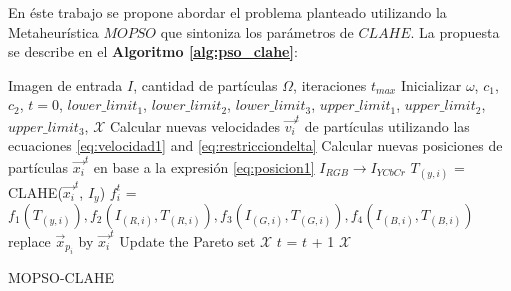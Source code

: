 En éste trabajo se propone abordar el problema planteado utilizando la Metaheurística $MOPSO$ que sintoniza los parámetros de $CLAHE$. La propuesta se describe en el \textbf{Algoritmo \ref{alg:pso_clahe}}:

\begin{algorithm}[H]
\scriptsize
\begin{algorithmic}[1]
\Require Imagen de entrada $I$, cantidad de partículas $\Omega$\label{symbol:mopsocantparticulas}, iteraciones $t_{max}$ 
\State Inicializar $\omega$, $c_1$, $c_2$, $t=0$, $lower\_limit_1$, $lower\_limit_2$, $lower\_limit_3$, $upper\_limit_1$, $upper\_limit_2$, $upper\_limit_3$, $\mathscr{X}$
        \State Calcular nuevas velocidades $\overrightarrow{v_i}^t$ de partículas utilizando las ecuaciones \eqref{eq:velocidad1} and \eqref{eq:restricciondelta}
        \State Calcular nuevas posiciones de partículas $\overrightarrow{x_i}^t$ en base a la expresión \eqref{eq:posicion1}
        \State $I_{RGB} \longrightarrow I_{YCbCr}$
        \State ${T_{(y,i)}}$ = CLAHE(${\overrightarrow{x_i}^t}$, ${I_y}$)
                \State ${f^t_i}$ = $f_1({T_{(y,i)}}),f_2({I_{(R,i)},T_{(R,i)}}),f_3({I_{(G,i)},T_{(G,i)}}),f_4({I_{(B,i)},T_{(B,i)}})$%
                \State replace $\overrightarrow{x}_{p_i}$ by $\overrightarrow{x_i}^t$
                \EndIf
                \State Update the Pareto set $\mathscr{X}$
                \EndIf
                \State $t$ = $t$ + 1
                \EndFor
                \EndWhile
                \Ensure $\mathscr{X}$
                \end{algorithmic}
                \caption{MOPSO-CLAHE}
                \label{alg:pso_clahe}
                \end{algorithm}

